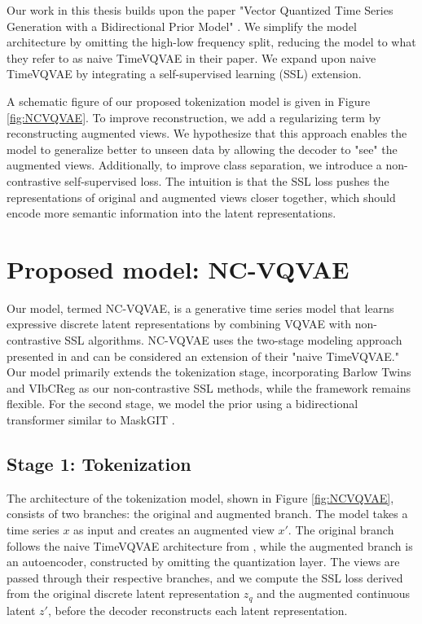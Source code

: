 \documentclass[../../thesis.tex]{subfiles}
\begin{document}
Our work in this thesis builds upon the paper "Vector Quantized Time Series Generation with a Bidirectional Prior Model" \cite{TimeVQVAE}. We simplify the model architecture by omitting the high-low frequency split, reducing the model to what they refer to as naive TimeVQVAE in their paper. We expand upon naive TimeVQVAE by integrating a self-supervised learning (SSL) extension. \newline

A schematic figure of our proposed tokenization model is given in Figure \ref{fig:NCVQVAE}. To improve reconstruction, we add a regularizing term by reconstructing augmented views. We hypothesize that this approach enables the model to generalize better to unseen data by allowing the decoder to "see" the augmented views. Additionally, to improve class separation, we introduce a non-contrastive self-supervised loss. The intuition is that the SSL loss pushes the representations of original and augmented views closer together, which should encode more semantic information into the latent representations.\newline

\section{Proposed model: NC-VQVAE}

Our model, termed NC-VQVAE, is a generative time series model that learns expressive discrete latent representations by combining VQVAE \cite{VQVAE} with non-contrastive SSL algorithms. NC-VQVAE uses the two-stage modeling approach presented in \cite{TimeVQVAE} and can be considered an extension of their "naive TimeVQVAE." Our model primarily extends the tokenization stage, incorporating Barlow Twins \cite{zbontar2021barlow} and VIbCReg \cite{lee2024computer} as our non-contrastive SSL methods, while the framework remains flexible. For the second stage, we model the prior using a bidirectional transformer similar to MaskGIT \cite{chang2022maskgit}.

\subsection{Stage 1: Tokenization}

The architecture of the tokenization model, shown in Figure \ref{fig:NCVQVAE}, consists of two branches: the original and augmented branch. The model takes a time series $x$ as input and creates an augmented view $x'$. The original branch follows the naive TimeVQVAE architecture from \cite{TimeVQVAE}, while the augmented branch is an autoencoder, constructed by omitting the quantization layer. The views are passed through their respective branches, and we compute the SSL loss derived from the original discrete latent representation $z_q$ and the augmented continuous latent $z'$, before the decoder reconstructs each latent representation. \newline 
\end{document}
